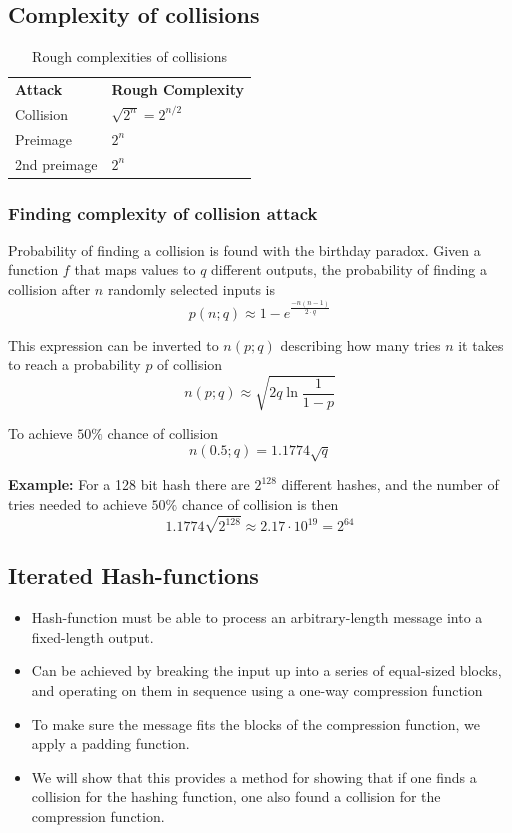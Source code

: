 \subsection{Complexity of collisions}
\begin{table}[H]
  \centering
  \begin{tabular}{ll}
    \textbf{Attack} & \textbf{Rough Complexity} \\
    Collision & $\sqrt{2^n}=2^{n/2}$ \\
    Preimage & $2^n$ \\
    2nd preimage & $2^n$ \\
  \end{tabular}
  \caption{Rough complexities of collisions}
\end{table}

\subsubsection*{Finding complexity of collision attack}
Probability of finding a collision is found with the birthday paradox. Given a function $f$ that maps
values to $q$ different outputs, the probability of finding a
collision after $n$ randomly selected inputs is
\[ p(n; q) \approx 1 - e^{\frac{-n(n-1)}{2\cdot q}}\]

This expression can be inverted to $n(p; q)$ describing how many tries
$n$ it takes to reach a probability $p$ of collision
\[ n(p; q) \approx \sqrt{2q \ln \frac{1}{1 - p}} \]

To achieve $50\%$ chance of collision
\[ n(0.5; q) = 1.1774 \sqrt{q} \]

\textbf{Example:} For a 128 bit hash there are $2^{128}$ different
hashes, and the number of tries needed to achieve $50\%$ chance of
collision is then
\[ 1.1774 \sqrt{2^{128}} \approx 2.17 \cdot 10^{19} = 2^{64}\]


\subsection{Iterated Hash-functions}
\begin{itemize}
\item Hash-function must be able to process an arbitrary-length
  message into a fixed-length output.
\item Can be achieved by breaking the input up into a series of
  equal-sized blocks, and operating on them in sequence using a
  one-way compression function
\item To make sure the message fits the blocks of the compression
  function, we apply a padding function.
\item We will show that this provides a method for showing that if one
  finds a collision for the hashing function, one also found a
  collision for the compression function.
\end{itemize}


